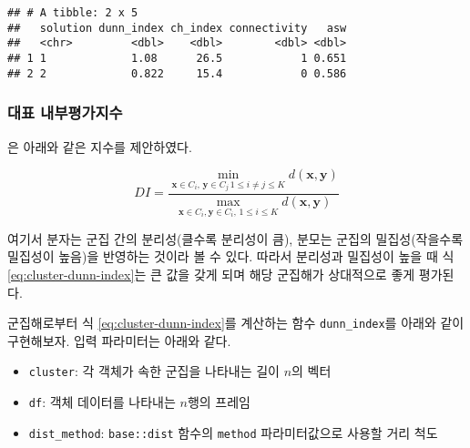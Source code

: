 \documentclass[]{book}
\providecommand{\tightlist}{%
  \setlength{\itemsep}{0pt}\setlength{\parskip}{0pt}}
\begin{document}
\begin{verbatim}
## # A tibble: 2 x 5
##   solution dunn_index ch_index connectivity   asw
##   <chr>         <dbl>    <dbl>        <dbl> <dbl>
## 1 1             1.08      26.5            1 0.651
## 2 2             0.822     15.4            0 0.586
\end{verbatim}

\hypertarget{cluster-evaluation-internal-index-explanation}{%
\subsubsection{대표 내부평가지수}\label{cluster-evaluation-internal-index-explanation}}

\citet{dunn1973fuzzy} 은 아래와 같은 지수를 제안하였다.

\begin{equation}
DI = \frac{\min_{\mathbf{x} \in C_i, \, \mathbf{y} \in C_j \, 1 \leq i \neq j \leq K} d(\mathbf{x}, \mathbf{y})}{\max_{\mathbf{x} \in C_i, \mathbf{y} \in C_i, \, 1 \leq i \leq K} d(\mathbf{x}, \mathbf{y})} \label{eq:cluster-dunn-index}
\end{equation}

여기서 분자는 군집 간의 분리성(클수록 분리성이 큼), 분모는 군집의 밀집성(작을수록 밀집성이 높음)을 반영하는 것이라 볼 수 있다. 따라서 분리성과 밀집성이 높을 때 식 \eqref{eq:cluster-dunn-index}는 큰 값을 갖게 되며 해당 군집해가 상대적으로 좋게 평가된다.

군집해로부터 식 \eqref{eq:cluster-dunn-index}를 계산하는 함수 \texttt{dunn\_index}를 아래와 같이 구현해보자. 입력 파라미터는 아래와 같다.

\begin{itemize}
\tightlist
\item
  \texttt{cluster}: 각 객체가 속한 군집을 나타내는 길이 \(n\)의 벡터
\item
  \texttt{df}: 객체 데이터를 나타내는 \(n\)행의 프레임
\item
  \texttt{dist\_method}: \texttt{base::dist} 함수의 \texttt{method} 파라미터값으로 사용할 거리 척도
\end{itemize}
\end{document}
